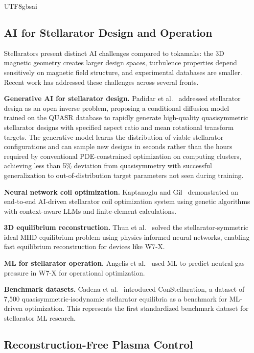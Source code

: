 \documentclass[12pt,a4paper]{article}
\begin{document}
\begin{CJK}{UTF8}{gbsai}
\subsection{AI for Stellarator Design and Operation}

Stellarators present distinct AI challenges compared to tokamaks: the 3D magnetic geometry creates larger design spaces, turbulence properties depend sensitively on magnetic field structure, and experimental databases are smaller. Recent work has addressed these challenges across several fronts.

\textbf{Generative AI for stellarator design.} Padidar et al.~\citep{Padidar2025} addressed stellarator design as an open inverse problem, proposing a conditional diffusion model trained on the QUASR database to rapidly generate high-quality quasisymmetric stellarator designs with specified aspect ratio and mean rotational transform targets. The generative model learns the distribution of viable stellarator configurations and can sample new designs in seconds rather than the hours required by conventional PDE-constrained optimization on computing clusters, achieving less than 5\% deviation from quasisymmetry with successful generalization to out-of-distribution target parameters not seen during training.

\textbf{Neural network coil optimization.} Kaptanoglu and Gil~\citep{Kaptanoglu2026} demonstrated an end-to-end AI-driven stellarator coil optimization system using genetic algorithms with context-aware LLMs and finite-element calculations.

\textbf{3D equilibrium reconstruction.} Thun et al.~\citep{Thun2026} solved the stellarator-symmetric ideal MHD equilibrium problem using physics-informed neural networks, enabling fast equilibrium reconstruction for devices like W7-X.

\textbf{ML for stellarator operation.} Angelis et al.~\citep{Angelis2026} used ML to predict neutral gas pressure in W7-X for operational optimization.

\textbf{Benchmark datasets.} Cadena et al.~\citep{Cadena2025} introduced ConStellaration, a dataset of 7,500 quasisymmetric-isodynamic stellarator equilibria as a benchmark for ML-driven optimization. This represents the first standardized benchmark dataset for stellarator ML research.

\subsection{Reconstruction-Free Plasma Control}


\end{CJK}
\end{document}
